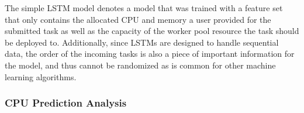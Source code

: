     The simple LSTM model denotes a  model that was trained with a feature set that only contains the allocated CPU and memory a user provided for the submitted task as well as the capacity of the worker pool resource the task should be deployed to. Additionally, since LSTMs are designed to handle sequential data, the order of the incoming tasks is also a piece of important information for the model, and thus cannot be randomized as is common for other machine learning algorithms.
    


    \subsubsection{CPU Prediction Analysis}
    \label{sec:cpu-prediction-analysis-simple-lstm-evaluation}

